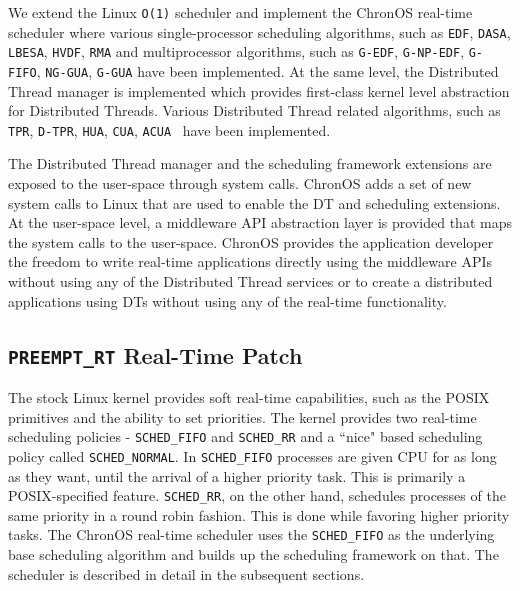 \documentclass[12pt,dvips]{report}
\begin{document}
We extend the Linux \texttt{O(1)} scheduler and implement the ChronOS real-time scheduler where various single-processor scheduling algorithms, such as \texttt{EDF}, \texttt{DASA}, \texttt{LBESA}, \texttt{HVDF}, \texttt{RMA} and multiprocessor algorithms, such as \texttt{G-EDF}, \texttt{G-NP-EDF}, \texttt{G-FIFO}, \texttt{NG-GUA}, \texttt{G-GUA} have been implemented. At the same level, the Distributed Thread manager is implemented which provides first-class kernel level abstraction for Distributed Threads. Various Distributed Thread related algorithms, such as \texttt{TPR}, \texttt{D-TPR}, \texttt{HUA}, \texttt{CUA}, \texttt{ACUA}~\cite{sherif10} have been implemented.

The Distributed Thread manager and the scheduling framework extensions are exposed to the user-space through system calls. ChronOS adds a set of new system calls to Linux that are used to enable the DT and scheduling extensions. At the user-space level, a middleware API abstraction layer is provided that maps the system calls to the user-space. ChronOS provides the application developer the freedom to write real-time applications directly using the middleware APIs without using any of the Distributed Thread services or to create a distributed applications using DTs without using any of the real-time functionality.

\subsection{\texttt{PREEMPT\_RT} Real-Time Patch}

The stock Linux kernel provides soft real-time capabilities, such as the POSIX primitives and the ability to set priorities. The kernel provides two real-time scheduling policies - \texttt{SCHED\_FIFO} and \texttt{SCHED\_RR} and a ``nice" based scheduling policy called \texttt{SCHED\_NORMAL}. In \texttt{SCHED\_FIFO} %
processes are given CPU for as long as they want, until the arrival of a higher priority task. This is primarily a POSIX-specified feature. \texttt{SCHED\_RR}, on the other hand, schedules processes of the same priority in a round robin fashion. This is done while favoring higher priority tasks. The ChronOS real-time scheduler uses the \texttt{SCHED\_FIFO} as the underlying base scheduling algorithm and builds up the scheduling framework on that. The scheduler is described in detail in the subsequent sections. 
\end{document}
